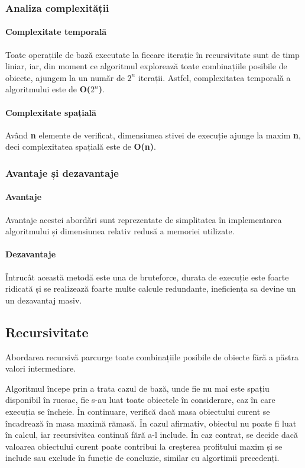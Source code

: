 \documentclass[runningheads]{llncs}
\begin{document}
\subsubsection{Analiza complexității}

\paragraph{Complexitate temporală} Toate operațiile de bază executate la fiecare
iterație în recursivitate sunt de timp liniar, iar, din moment ce algoritmul explorează
toate combinațiile posibile de obiecte, ajungem la un număr de $2^n$ iterații. Astfel,
complexitatea temporală a algoritmului este de \textbf{O($2^n$)}.

\paragraph{Complexitate spațială} Având \textbf{n} elemente de verificat, dimensiunea stivei
de execuție ajunge la maxim \textbf{n}, deci complexitatea spațială este de \textbf{O(n)}.

\subsubsection{Avantaje și dezavantaje}

\paragraph{Avantaje} Avantaje acestei abordări sunt reprezentate de simplitatea în implementarea
algoritmului și dimensiunea relativ redusă a memoriei utilizate.

\paragraph{Dezavantaje} Întrucât această metodă este una de bruteforce, durata de execuție este
foarte ridicată și se realizează foarte multe calcule redundante, ineficiența sa devine un
un dezavantaj masiv.

\subsection{Recursivitate}

Abordarea recursivă parcurge toate combinațiile posibile de obiecte fără a păstra valori intermediare.

Algoritmul începe prin a trata cazul de bază, unde fie nu mai este spațiu disponibil
în rucsac, fie s-au luat toate obiectele în considerare, caz în care execuția se încheie.
În continuare, verifică dacă masa obiectului curent se încadrează în masa maximă rămasă.
În cazul afirmativ, obiectul nu poate fi luat în calcul, iar recursivitea continuă fără
a-l include. În caz contrat, se decide dacă valoarea obiectului curent poate contribui la creșterea
profitului maxim și se include sau exclude în funcție de concluzie, similar cu algortimii precedenți.
\end{document}
